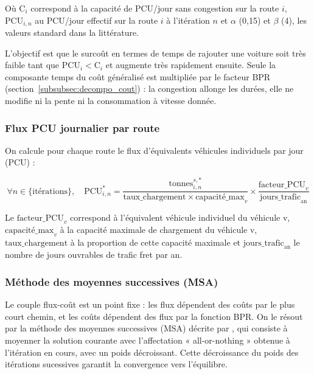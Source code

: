 \documentclass[12pt,a4paper,french]{report}
\begin{document}
	Où $\text{C}_i$ correspond à la capacité de PCU/jour sans congestion sur la route $i$, $\text{PCU}_{i,n}$ au PCU/jour effectif sur la route $i$ à l'itération $n$ et $\alpha$ (0,15) et $\beta$ (4), les valeurs standard dans la littérature.

	\vspace{1em}

	L'objectif est que le surcoût en termes de temps de rajouter une voiture soit très faible tant que $\text{PCU}_i < \text{C}_i$ et augmente très rapidement ensuite. Seule la composante temps du coût généralisé est multipliée par le facteur BPR (section~\ref{subsubsec:decompo_cout}) : la congestion allonge les durées, elle ne modifie ni la pente ni la consommation à vitesse donnée.
	
	\subsubsection{Flux PCU journalier par route}
	\label{subsubsec:PCU}
	
	On calcule pour chaque route le flux d'équivalents véhicules individuels par jour (PCU) :
	
	\begin{equation}
		\forall n \in \{\text{itérations}\},
		 \quad \text{PCU}_{i,n}^* = \frac{\text{tonnes}_{i,n}^{s,*}}{\text{taux\_chargement} \times \text{capacité\_max}_v} \times \frac{\text{facteur\_PCU}_v}{ \text{jours\_trafic}_{\text{an}}}
	\end{equation}
	
	Le $\text{facteur\_PCU}_v$ correspond à l'équivalent véhicule individuel du véhicule v, $\text{capacité\_max}_v$ à la capacité maximale de chargement du véhicule v, $\text{taux\_chargement}$ à la proportion de cette capacité maximale et $\text{jours\_trafic}_{\text{an}}$ le nombre de jours ouvrables de trafic fret par an.
	
	
	\subsubsection{Méthode des moyennes successives (MSA)}
	\label{subsubsec:MSA}

	Le couple flux-coût est un point fixe : les flux dépendent des coûts par le plus court chemin, et les coûts dépendent des flux par la fonction BPR. On le résout par la méthode des moyennes successives (MSA) décrite par \cite{Sheffi1985}, qui consiste à moyenner la solution courante avec l'affectation « all-or-nothing » obtenue à l'itération en cours, avec un poids décroissant. Cette décroissance du poids des itérations sucessives garantit la convergence vers l'équilibre.
	
\end{document}
